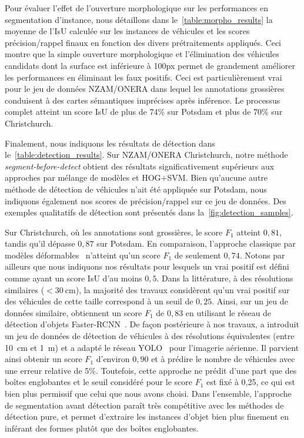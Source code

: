 Pour évaluer l'effet de l'ouverture morphologique sur les performances en segmentation d'instance, nous détaillons dans le~\cref{table:morpho_results} la moyenne de l'\gls{IsU} calculée sur les instances de véhicules et les scores précision/rappel finaux en fonction des divers prétraitements appliqués. Ceci montre que la simple ouverture morphologique et l'élimination des véhicules candidats dont la surface est inférieure à 100px permet de grandement améliorer les performances en éliminant les faux positifs. Ceci est particulièrement vrai pour le jeu de données NZAM/ONERA dans lequel les annotations grossières conduisent à des cartes sémantiques imprécises après inférence. Le processus complet atteint un score \gls{IsU} de plus de 74\% sur Potsdam et plus de 70\% sur Christchurch.

Finalement, nous indiquons les résultats de détection dans le~\cref{table:detection_results}. Sur NZAM/ONERA Christchurch, notre méthode \textit{segment-before-detect} obtient des résultats significativement supérieurs aux approches par mélange de modèles et \gls{HOG}+\gls{SVM}. Bien qu'aucune autre méthode de détection de véhicules n'ait été appliquée sur Potsdam, nous indiquons également nos scores de précision/rappel sur ce jeu de données. Des exemples qualitatifs de détection sont présentés dans la~\cref{fig:detection_samples}.

 Sur Christchurch, où les annotations sont grossières, le score $F_1$ atteint $0,81$, tandis qu'il dépasse $0,87$ sur Potsdam. En comparaison, l'approche classique par modèles déformables~\cite{randrianarivo_urban_2013} n'atteint qu'un score $F_1$ de seulement $0,74$. Notons par ailleurs que nous indiquons nos résultats pour lesquels un vrai positif est défini comme ayant un score \gls{IsU} d'au moins $0,5$. Dans la littérature, à des résolutions similaires ($<\SI{30}{\centi\meter}$), la majorité des travaux considèrent qu'un vrai positif sur des véhicules de cette taille correspond à un seuil de $0,25$. Ainsi, sur un jeu de données similaire, \citet{tang_vehicle_2017} obtiennent un score $F_1$ de $0,83$ en utilisant le réseau de détection d'objets Faster-RCNN~\cite{ren_faster_2017}. De façon postérieure à nos travaux, \citet{van_etten_you_2018} a introduit un jeu de données de détection de véhicules à des résolutions équivalentes (entre \SI{10}{\centi\meter} et \SI{1}{\meter}) et a adapté le réseau YOLO~\cite{redmon_you_2016} pour l'imagerie aérienne. Il parvient ainsi obtenir un score $F_1$ d'environ $0,90$ et à prédire le nombre de véhicules avec une erreur relative de 5\%. Toutefois, cette approche ne prédit d'une part que des boîtes englobantes et le seuil considéré pour le score $F_1$ est fixé à 0,25, ce qui est bien plus permissif que celui que nous avons choisi. Dans l'ensemble, l'approche de segmentation avant détection paraît très compétitive avec les méthodes de détection pure, et permet d'extraire les instances d'objet bien plus finement en inférant des formes plutôt que des boîtes englobantes.



